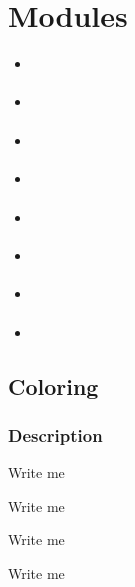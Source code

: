 \documentclass[letterpaper,10pt,english]{sphinxmanual}
\begin{document}
\sphinxstepscope


\chapter{Modules}
\label{\detokenize{Sub-Packages:modules}}\label{\detokenize{Sub-Packages::doc}}\begin{itemize}
\item {} 
\sphinxAtStartPar
{\hyperref[\detokenize{Sub-Packages:coloring-module}]{}}

\item {} 
\sphinxAtStartPar
{\hyperref[\detokenize{Sub-Packages:event-processing-module}]{}}

\item {} 
\sphinxAtStartPar
{\hyperref[\detokenize{Sub-Packages:io-module}]{}}

\item {} 
\sphinxAtStartPar
{\hyperref[\detokenize{Sub-Packages:image-processing-module}]{}}

\item {} 
\sphinxAtStartPar
{\hyperref[\detokenize{Sub-Packages:interactive-visuals-module}]{}}

\item {} 
\sphinxAtStartPar
{\hyperref[\detokenize{Sub-Packages:reorganization-module}]{}}

\item {} 
\sphinxAtStartPar
{\hyperref[\detokenize{Sub-Packages:signal-processing-module}]{}}

\item {} 
\sphinxAtStartPar
{\hyperref[\detokenize{Sub-Packages:static-visuals-module}]{}}

\end{itemize}


\section{Coloring}
\label{\detokenize{Sub-Packages:coloring}}\label{\detokenize{Sub-Packages:coloring-module}}

\subsection{Description}
\label{\detokenize{Sub-Packages:description}}
\begin{DUlineblock}{0em}
\item[] Write me
\item[] Write me
\item[] Write me
\item[] Write me
\end{DUlineblock}
\end{document}
